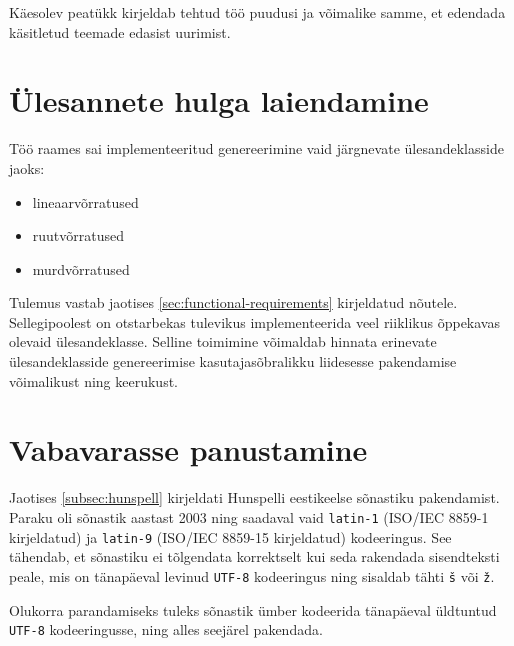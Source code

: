 Käesolev peatükk kirjeldab tehtud töö puudusi ja võimalike samme, et edendada käsitletud teemade edasist uurimist.

\section{Ülesannete hulga laiendamine}

Töö raames sai implementeeritud genereerimine vaid järgnevate ülesandeklasside jaoks:

\begin{itemize}
  \item lineaarvõrratused
  \item ruutvõrratused
  \item murdvõrratused
\end{itemize}

Tulemus vastab jaotises \ref{sec:functional-requirements} kirjeldatud nõutele. Sellegipoolest on otstarbekas tulevikus implementeerida veel riiklikus õppekavas olevaid ülesandeklasse. Selline toimimine võimaldab hinnata erinevate ülesandeklasside genereerimise kasutajasõbralikku liidesesse pakendamise võimalikust ning keerukust.

\section{Vabavarasse panustamine}

Jaotises \ref{subsec:hunspell} kirjeldati Hunspelli eestikeelse sõnastiku pakendamist. Paraku oli sõnastik aastast 2003 ning saadaval vaid \texttt{latin-1} (ISO/IEC 8859-1 kirjeldatud) ja \texttt{latin-9} (ISO/IEC 8859-15 kirjeldatud) kodeeringus. See tähendab, et sõnastiku ei tõlgendata korrektselt kui seda rakendada sisendteksti peale, mis on tänapäeval levinud \texttt{UTF-8} kodeeringus ning sisaldab tähti \texttt{š} või \texttt{ž}.

Olukorra parandamiseks tuleks sõnastik ümber kodeerida tänapäeval üldtuntud \texttt{UTF-8} kodeeringusse, ning alles seejärel pakendada.


